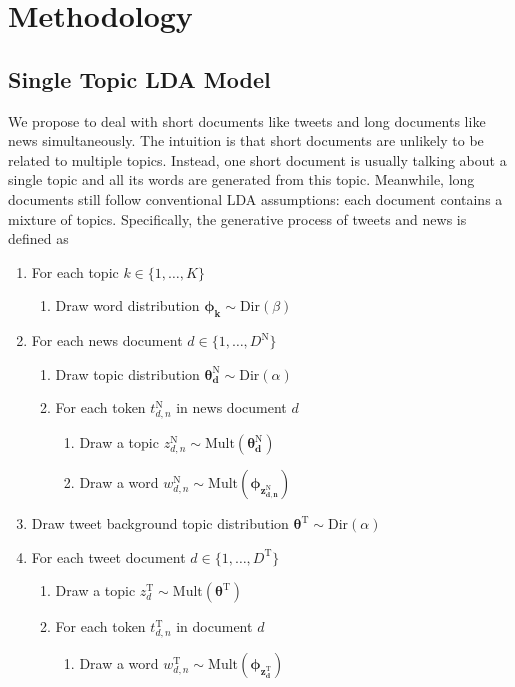\section{Methodology}
\label{sec:model}

\subsection{Single Topic LDA Model}

We propose \stlda to deal with short documents like tweets and long documents like news simultaneously. The intuition is that short documents are unlikely to be related to multiple topics. Instead, one short document is usually talking about a single topic and all its words are generated from this topic. Meanwhile, long documents still follow conventional LDA assumptions: each document contains a mixture of topics. Specifically, the generative process of tweets and news is defined as

\begin{enumerate}
\item For each topic $k \in \{1, \ldots, K\}$
    \begin{enumerate}
    \item Draw word distribution $\bm{\phi_k} \sim \mathrm{Dir}(\beta)$
    \end{enumerate}
\item For each news document $d\in \{1, \ldots, D^\mathrm{N}\}$
    \begin{enumerate}
    \item Draw topic distribution $\bm{\theta^{\mathrm{N}}_{d}} \sim \mathrm{Dir}(\alpha)$
    \item For each token $t^{\mathrm{N}}_{d,n}$ in news document $d$
        \begin{enumerate}
        \item Draw a topic $z^{\mathrm{N}}_{d,n} \sim \mathrm{Mult}(\bm{\theta^\mathrm{N}_d})$
        \item Draw a word $w^{\mathrm{N}}_{d,n} \sim \mathrm{Mult}(\bm{\phi_{z^{\mathrm{N}}_{d,n}}})$
        \end{enumerate}
    \end{enumerate}
\item Draw tweet background topic distribution $\bm{\theta^{\mathrm{T}}} \sim \mathrm{Dir}(\alpha)$
\item For each tweet document $d \in \{1, \ldots, D^\mathrm{T}\}$
    \begin{enumerate}
    \item Draw a topic $z^{\mathrm{T}}_d \sim \mathrm{Mult}(\bm{\theta^{\mathrm{T}}})$
    \item For each token $t^{\mathrm{T}}_{d,n}$ in document $d$
        \begin{enumerate}
        \item Draw a word $w^{\mathrm{T}}_{d,n} \sim \mathrm{Mult}(\bm{\phi_{z^{\mathrm{T}}_d}})$
        \end{enumerate}
    \end{enumerate}
\end{enumerate}

